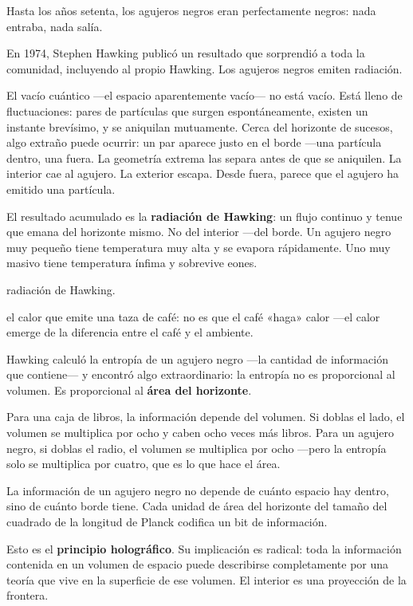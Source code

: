 \noindent Hasta los años setenta, los agujeros negros eran perfectamente negros: nada entraba, nada salía.

En 1974, Stephen Hawking publicó un resultado que sorprendió a toda la comunidad, incluyendo al propio Hawking. Los agujeros negros emiten radiación.

El vacío cuántico —el espacio aparentemente vacío— no está vacío. Está lleno de fluctuaciones: pares de partículas que surgen espontáneamente, existen un instante brevísimo, y se aniquilan mutuamente. Cerca del horizonte de sucesos, algo extraño puede ocurrir: un par aparece justo en el borde —una partícula dentro, una fuera. La geometría extrema las separa antes de que se aniquilen. La interior cae al agujero. La exterior escapa. Desde fuera, parece que el agujero ha emitido una partícula.

El resultado acumulado es la \textbf{radiación de Hawking}: un flujo continuo y tenue que emana del horizonte mismo. No del interior —del borde. Un agujero negro muy pequeño tiene temperatura muy alta y se evapora rápidamente. Uno muy masivo tiene temperatura ínfima y sobrevive eones.

\begin{fisica}
 radiación de Hawking.

 el calor que emite una taza de café: no es que el café «haga» calor —el calor emerge de la diferencia entre el café y el ambiente.
\end{fisica}
\noindent Hawking calculó la entropía de un agujero negro —la cantidad de información que contiene— y encontró algo extraordinario: la entropía no es proporcional al volumen. Es proporcional al \textbf{área del horizonte}.

Para una caja de libros, la información depende del volumen. Si doblas el lado, el volumen se multiplica por ocho y caben ocho veces más libros. Para un agujero negro, si doblas el radio, el volumen se multiplica por ocho —pero la entropía solo se multiplica por cuatro, que es lo que hace el área.

La información de un agujero negro no depende de cuánto espacio hay dentro, sino de cuánto borde tiene. Cada unidad de área del horizonte del tamaño del cuadrado de la longitud de Planck codifica un bit de información.

Esto es el \textbf{principio holográfico}. Su implicación es radical: toda la información contenida en un volumen de espacio puede describirse completamente por una teoría que vive en la superficie de ese volumen. El interior es una proyección de la frontera.

